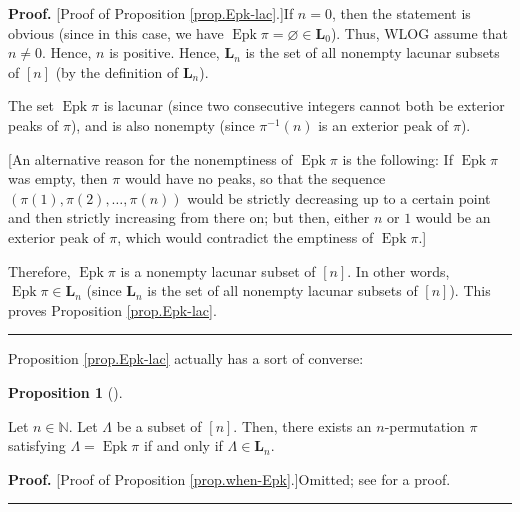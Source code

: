 \documentclass[numbers=enddot,12pt,final,onecolumn,notitlepage]{scrartcl}%
\theoremstyle{definition}
\newtheorem{prop}[theo]{Proposition}
\newenvironment{proposition}[1][]
{\begin{prop}[#1]\begin{leftbar}}
{\end{leftbar}\end{prop}}
\newenvironment{proof}[1][Proof]{\noindent\textbf{#1.} }{\ \rule{0.5em}{0.5em}}
\newenvironment{verlong}{}{}
\newenvironment{vershort}{}{}
\begin{document}
\begin{proof}
[Proof of Proposition \ref{prop.Epk-lac}.]If $n=0$, then the statement is
obvious (since in this case, we have $\operatorname*{Epk}\pi=\varnothing
\in\mathbf{L}_{0}$). Thus, WLOG assume that $n\neq0$. Hence, $n$ is positive.
Hence, $\mathbf{L}_{n}$ is the set of all nonempty lacunar subsets of $\left[
n\right]  $ (by the definition of $\mathbf{L}_{n}$).

The set $\operatorname*{Epk}\pi$ is lacunar (since two consecutive integers
cannot both be exterior peaks of $\pi$), and is also nonempty (since $\pi
^{-1}\left(  n\right)  $ is an exterior peak of $\pi$).
\begin{verlong}

[An alternative reason for the nonemptiness of $\operatorname*{Epk}\pi$ is the
following: If $\operatorname*{Epk}\pi$ was empty, then $\pi$ would have no
peaks, so that the sequence $\left(  \pi\left(  1\right)  ,\pi\left(
2\right)  ,\ldots,\pi\left(  n\right)  \right)  $ would be strictly decreasing
up to a certain point and then strictly increasing from there on; but then,
either $n$ or $1$ would be an exterior peak of $\pi$, which would contradict
the emptiness of $\operatorname*{Epk}\pi$.]

\end{verlong}
Therefore, $\operatorname*{Epk}\pi$ is a nonempty lacunar subset of
$\left[  n\right]  $. In other words, $\operatorname*{Epk}\pi\in\mathbf{L}%
_{n}$ (since $\mathbf{L}_{n}$ is the set of all nonempty lacunar subsets of
$\left[  n\right]  $). This proves Proposition \ref{prop.Epk-lac}.
\end{proof}

Proposition \ref{prop.Epk-lac} actually has a sort of converse:

\begin{proposition}
\label{prop.when-Epk}Let $n\in\mathbb{N}$. Let $\Lambda$ be a subset of
$\left[  n\right]  $. Then, there exists an $n$-permutation $\pi$ satisfying
$\Lambda=\operatorname*{Epk}\pi$ if and only if $\Lambda\in\mathbf{L}_{n}$.
\end{proposition}

\begin{vershort}
\begin{proof}
[Proof of Proposition \ref{prop.when-Epk}.]Omitted; see \cite{verlong} for a proof.
\end{proof}
\end{vershort}
\end{document}
